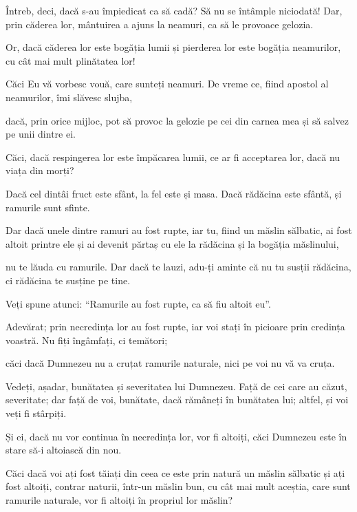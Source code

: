 {\par }{\PP {}Întreb, deci, dacă s-au împiedicat ca să cadă? Să nu se întâmple niciodată! Dar, prin căderea lor, mântuirea a ajuns la neamuri, ca să le provoace gelozia.

Or, dacă căderea lor este bogăția lumii și pierderea lor este bogăția neamurilor, cu cât mai mult plinătatea lor!


\par }{\PP {}Căci Eu vă vorbesc vouă, care sunteți neamuri. De vreme ce, fiind apostol al neamurilor, îmi slăvesc slujba,

dacă, prin orice mijloc, pot să provoc la gelozie pe cei din carnea mea și să salvez pe unii dintre ei.

Căci, dacă respingerea lor este împăcarea lumii, ce ar fi acceptarea lor, dacă nu viața din morți?


\par }{\PP {}Dacă cel dintâi fruct este sfânt, la fel este și masa. Dacă rădăcina este sfântă, și ramurile sunt sfinte.

Dar dacă unele dintre ramuri au fost rupte, iar tu, fiind un măslin sălbatic, ai fost altoit printre ele și ai devenit părtaș cu ele la rădăcina și la bogăția măslinului,

nu te lăuda cu ramurile. Dar dacă te lauzi, adu-ți aminte că nu tu susții rădăcina, ci rădăcina te susține pe tine.

Veți spune atunci: “Ramurile au fost rupte, ca să fiu altoit eu”.

Adevărat; prin necredința lor au fost rupte, iar voi stați în picioare prin credința voastră. Nu fiți îngâmfați, ci temători;

căci dacă Dumnezeu nu a cruțat ramurile naturale, nici pe voi nu vă va cruța.

Vedeți, așadar, bunătatea și severitatea lui Dumnezeu. Față de cei care au căzut, severitate; dar față de voi, bunătate, dacă rămâneți în bunătatea lui; altfel, și voi veți fi stârpiți.

Și ei, dacă nu vor continua în necredința lor, vor fi altoiți, căci Dumnezeu este în stare să-i altoiască din nou.

Căci dacă voi ați fost tăiați din ceea ce este prin natură un măslin sălbatic și ați fost altoiți, contrar naturii, într-un măslin bun, cu cât mai mult aceștia, care sunt ramurile naturale, vor fi altoiți în propriul lor măslin?


}
